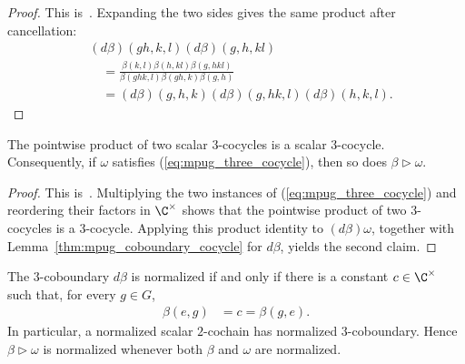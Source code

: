 \begin{proof}\leanok
    This is~\cite[``A three-coboundary is a
        three-cocycle'']{QICLean2026Blueprint}.
    Expanding the two sides gives the same product after cancellation:
    \begin{align}
         & (d\beta)(gh,k,l)(d\beta)(g,h,kl) \\
         & \quad =
        \frac{\beta(k,l)\beta(h,kl)\beta(g,hkl)}
        {\beta(ghk,l)\beta(gh,k)\beta(g,h)} \\
         & \quad =
        (d\beta)(g,h,k)(d\beta)(g,hk,l)(d\beta)(h,k,l).
    \end{align}
\end{proof}

\begin{lemma}
    \label{thm:mpug_gauge_preserves_cocycle}
    \leanok
    The pointwise product of two scalar $3$-cocycles is a scalar
    $3$-cocycle. Consequently, if $\omega$ satisfies
    (\ref{eq:mpug_three_cocycle}), then so does
    $\beta\mathbin{\triangleright}\omega$.
\end{lemma}

\begin{proof}\leanok
    This is~\cite[``Products and gauges preserve
        three-cocycles'']{QICLean2026Blueprint}.
    Multiplying the two instances of (\ref{eq:mpug_three_cocycle}) and
    reordering their factors in $\C^\times$ shows that the pointwise product of
    two $3$-cocycles is a $3$-cocycle. Applying this product identity to
    $(d\beta)\omega$, together with Lemma~\ref{thm:mpug_coboundary_cocycle}
    for $d\beta$, yields the second claim.
\end{proof}

\begin{lemma}
    \label{thm:mpug_gauge_preserves_normalization}
    \leanok
    The $3$-coboundary $d\beta$ is normalized if and only if there is a
    constant $c\in\C^\times$ such that, for every $g\in G$,
    \begin{align}
        \beta(e,g) & =c=\beta(g,e).
        \label{eq:mpug_coboundary_normalized_iff}
    \end{align}
    In particular, a normalized scalar $2$-cochain has normalized
    $3$-coboundary. Hence $\beta\mathbin{\triangleright}\omega$ is normalized
    whenever both $\beta$ and $\omega$ are normalized.
\end{lemma}

